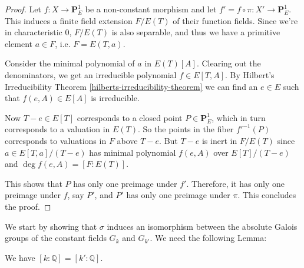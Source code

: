 \begin{proof}
Let $f: X\to\mathbf{P}^1_E$ be a non-constant morphism and let $f' =  f\circ \pi: X'\to\mathbf{P}^1_E$. This induces a finite field extension $F/E(T)$ of their function fields. Since we're in characteristic $0$, $F/E(T)$ is also separable, and thus we have a primitive element $a\in F$, i.e. $F = E(T,a)$. 

Consider the minimal polynomial of $a$ in $E(T)[A]$. Clearing out the denominators, we get an irreducible polynomial $f\in E[T,A]$. By Hilbert's Irreducibility Theorem \ref{hilberts-irreducibility-theorem} we can find an $e\in E$ such that $f(e,A)\in E[A]$ is irreducible. 

Now $T-e\in E[T]$ corresponds to a closed point $P\in \mathbf{P}^1_E$, which in turn corresponds to a valuation in $E(T)$. So the points in the fiber $f'^{-1}(P)$ corresponds to valuations in $F$ above $T-e$. But $T-e$ is inert in $F/E(T)$ since $a\in E[T,a]/(T-e)$ has minimal polynomial $f(e,A)$ over $E[T]/(T-e)$ and $\deg f(e,A) = [F:E(T)]$. 

This shows that $P$ has only one preimage under $f'$. Therefore, it has only one preimage under $f$, say $P'$, and $P'$ has only one preimage under $\pi$. This concludes the proof.
\end{proof}

We start by showing that $\sigma$ induces an isomorphism between the absolute Galois groups of the constant fields $G_k$ and $G_{k'}$. We need the following Lemma:

\begin{lemma}\label{4.2-pre}
We have $[k:\mathbb{Q}] = [k':\mathbb{Q}]$.
\end{lemma}

